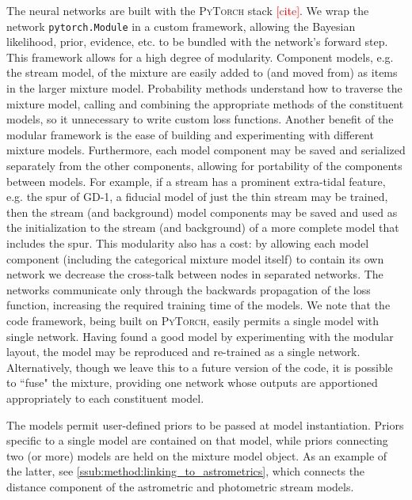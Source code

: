\documentclass[twocolumn]{aastex631}
\newcommand{\package}[1]{\textsc{#1}}
\newcommand{\stream}[1]{#1}
\newcommand{\TODO}[1]{{\textcolor{red}{#1}}}
\begin{document}
        The neural networks are built with the \package{PyTorch} stack
        \TODO{[cite]}. We wrap the network \texttt{pytorch.Module} in a custom
        framework, allowing the Bayesian likelihood, prior, evidence, etc. to be
        bundled with the network's forward step. This framework allows for a
        high degree of modularity. Component models, e.g. the stream model, of
        the mixture are easily added to (and moved from) as items in the larger
        mixture model. Probability methods understand how to traverse the
        mixture model, calling and combining the appropriate methods of the
        constituent models, so it unnecessary to write custom loss functions.
        Another benefit of the modular framework is the ease of building and
        experimenting with different mixture models. Furthermore, each model
        component may be saved and serialized separately from the other
        components, allowing for portability of the components between models.
        For example, if a stream has a prominent extra-tidal feature, e.g. the
        spur of \stream{GD-1}, a fiducial model of just the thin stream may be
        trained, then the stream (and background) model components may be saved
        and used as the initialization to the stream (and background) of a more
        complete model that includes the spur. This modularity also has a cost:
        by allowing each model component (including the categorical mixture
        model itself) to contain its own network we decrease the cross-talk
        between nodes in separated networks. The networks communicate only
        through the backwards propagation of the loss function, increasing the
        required training time of the models. We note that the code framework,
        being built on \package{PyTorch}, easily permits a single model with
        single network. Having found a good model by experimenting with the
        modular layout, the model may be reproduced and re-trained as a single
        network. Alternatively, though we leave this to a future version of the
        code, it is possible to ``fuse" the mixture, providing one network whose
        outputs are apportioned appropriately to each constituent model.

        The models permit user-defined priors to be passed at model
        instantiation.  Priors specific to a single model are contained on that
        model, while priors connecting two (or more) models are held on the
        mixture model object. As an example of the latter, see
        \autoref{ssub:method:linking_to_astrometrics}, which connects the
        distance component of the astrometric and photometric stream models.
\end{document}
